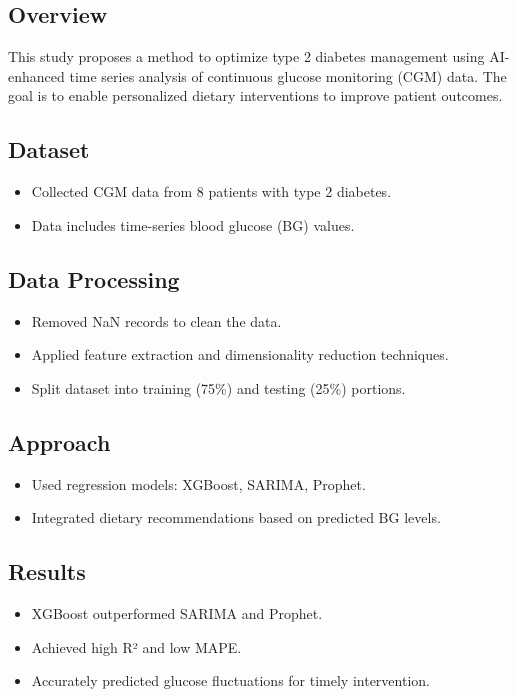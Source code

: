 \subsection*{Overview}
This study proposes a method to optimize type 2 diabetes management using AI-enhanced time series analysis of continuous glucose monitoring (CGM) data. The goal is to enable personalized dietary interventions to improve patient outcomes.

\subsection*{Dataset}
\begin{itemize}
    \item Collected CGM data from 8 patients with type 2 diabetes.
    \item Data includes time-series blood glucose (BG) values.
\end{itemize}

\subsection*{Data Processing}
\begin{itemize}
    \item Removed NaN records to clean the data.
    \item Applied feature extraction and dimensionality reduction techniques.
    \item Split dataset into training (75\%) and testing (25\%) portions.
\end{itemize}

\subsection*{Approach}
\begin{itemize}
    \item Used regression models: XGBoost, SARIMA, Prophet.
    \item Integrated dietary recommendations based on predicted BG levels.
\end{itemize}

\subsection*{Results}
\begin{itemize}
    \item XGBoost outperformed SARIMA and Prophet.
    \item Achieved high R² and low MAPE.
    \item Accurately predicted glucose fluctuations for timely intervention.
\end{itemize}

